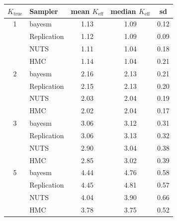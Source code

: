 \begin{tabular}{clccc}
\toprule
$K_{\text{true}}$ & Sampler & mean $K_{\text{eff}}$ & median $K_{\text{eff}}$ & sd \\
\midrule
1 & bayesm & 1.13 & 1.09 & 0.12 \\
 & Replication & 1.12 & 1.09 & 0.09 \\
 & NUTS & 1.11 & 1.04 & 0.18 \\
 & HMC & 1.14 & 1.04 & 0.21 \\
2 & bayesm & 2.16 & 2.13 & 0.21 \\
 & Replication & 2.15 & 2.13 & 0.20 \\
 & NUTS & 2.03 & 2.04 & 0.19 \\
 & HMC & 2.02 & 2.04 & 0.17 \\
3 & bayesm & 3.06 & 3.12 & 0.31 \\
 & Replication & 3.06 & 3.13 & 0.32 \\
 & NUTS & 2.90 & 3.04 & 0.38 \\
 & HMC & 2.85 & 3.02 & 0.39 \\
5 & bayesm & 4.44 & 4.76 & 0.58 \\
 & Replication & 4.45 & 4.81 & 0.57 \\
 & NUTS & 4.04 & 3.90 & 0.66 \\
 & HMC & 3.78 & 3.75 & 0.52 \\
\bottomrule
\end{tabular}
